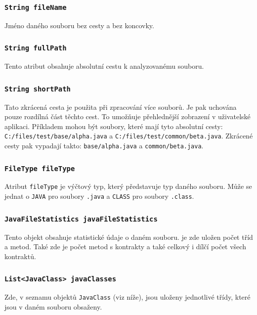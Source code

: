 				\subsubsection{\texttt{String fileName}}	
					Jméno daného souboru bez cesty a bez koncovky.
					
				\subsubsection{\texttt{String fullPath}}
					Tento atribut obsahuje absolutní cestu k analyzovanému souboru.
					
				\subsubsection{\texttt{String shortPath}}
					Tato zkrácená cesta je použita při zpracování více souborů. Je pak uchována pouze rozdílná část těchto cest. To umožňuje přehlednější zobrazení v uživatelské aplikaci. Příkladem mohou být soubory, které mají tyto absolutní cesty: \texttt{C:/files/test/base/alpha.java} a \texttt{C:/files/test/common/beta.java}. Zkrácené cesty pak vypadají takto: \texttt{base/alpha.java} a \texttt{common/beta.java}.
					
				\subsubsection{\texttt{FileType fileType}}
					Atribut \texttt{fileType} je výčtový typ, který představuje typ daného souboru. Může se jednat o \texttt{JAVA} pro soubory \texttt{.java} a \texttt{CLASS} pro soubory \texttt{.class}.
					
				\subsubsection{\texttt{JavaFileStatistics javaFileStatistics}}
					Tento objekt obsahuje statistické údaje o daném souboru. je zde uložen počet tříd a metod. Také zde je počet metod s kontrakty a také celkový i dílčí počet všech kontraktů.
					
				\subsubsection{\texttt{List<JavaClass> javaClasses}}
					Zde, v seznamu objektů \texttt{JavaClass} (viz níže), jsou uloženy jednotlivé třídy, které jsou v daném souboru obsaženy.
			
			
